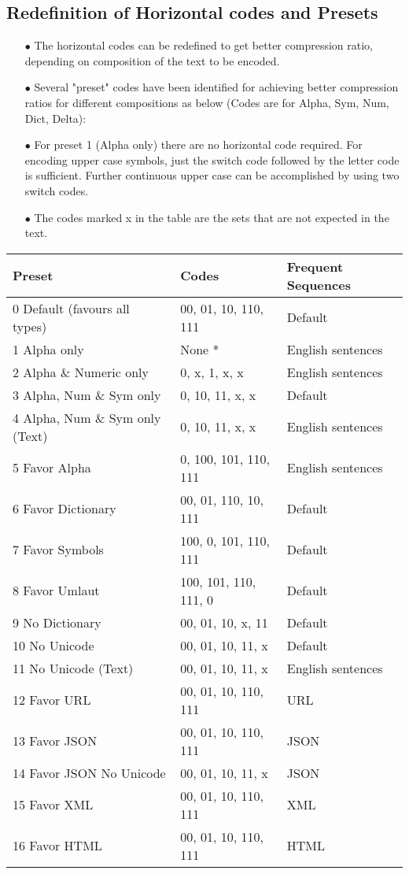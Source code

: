 \documentclass[]{article}
\begin{document}
\subsection{Redefinition of Horizontal codes and Presets}
\begin{itemize}
	\item[$\bullet$] The horizontal codes can be redefined to get better compression ratio, depending on composition of the text to be encoded.
	\item[$\bullet$] Several "preset" codes have been identified for achieving better compression ratios for different compositions as below (Codes are for Alpha, Sym, Num, Dict, Delta):
	\item[$\bullet$] For preset 1 (Alpha only) there are no horizontal code required. For encoding upper case symbols, just the switch code followed by the letter code is sufficient. Further continuous upper case can be accomplished by using two switch codes.
	\item[$\bullet$] The codes marked x in the table are the sets that are not expected in the text.
\end{itemize}
\begin{tabular}{ | l | l | l |} \hline
	﻿\textbf{Preset} & ﻿\textbf{Codes} & \textbf{Frequent Sequences} \\ \hline
	0 Default (favours all types) & 00, 01, 10, 110, 111 & Default \\ \hline
	1 Alpha only & None * & English sentences \\ \hline
	2 Alpha \& Numeric only & 0, x, 1, x, x & English sentences \\ \hline
	3 Alpha, Num \& Sym only & 0, 10, 11, x, x & Default \\ \hline
	4 Alpha, Num \& Sym only (Text) & 0, 10, 11, x, x & English sentences \\ \hline
	5 Favor Alpha & 0, 100, 101, 110, 111 & English sentences \\ \hline
	6 Favor Dictionary & 00, 01, 110, 10, 111 & Default \\ \hline
	7 Favor Symbols & 100, 0, 101, 110, 111 & Default \\ \hline
	8 Favor Umlaut & 100, 101, 110, 111, 0 & Default \\ \hline
	9 No Dictionary & 00, 01, 10, x, 11 & Default \\ \hline
	10 No Unicode & 00, 01, 10, 11, x & Default \\ \hline
	11 No Unicode (Text) & 00, 01, 10, 11, x & English sentences \\ \hline
	12 Favor URL & 00, 01, 10, 110, 111 & URL \\ \hline
	13 Favor JSON & 00, 01, 10, 110, 111 & JSON \\ \hline
	14 Favor JSON No Unicode & 00, 01, 10, 11, x & JSON \\ \hline
	15 Favor XML & 00, 01, 10, 110, 111 & XML \\ \hline
	16 Favor HTML & 00, 01, 10, 110, 111 & HTML \\ \hline
\end{tabular}
\end{document}
